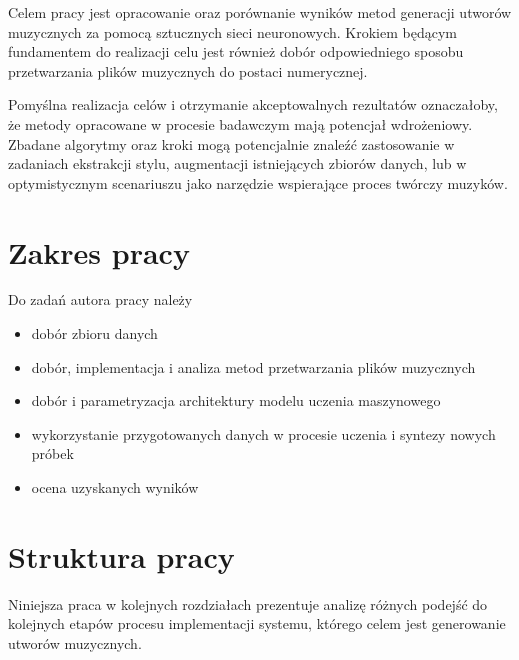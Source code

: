 {{        Celem pracy jest opracowanie oraz porównanie wyników metod generacji utworów muzycznych za pomocą
        sztucznych sieci neuronowych. Krokiem będącym fundamentem do realizacji celu jest również
        dobór odpowiedniego sposobu przetwarzania plików muzycznych do postaci numerycznej.
        
        
        Pomyślna realizacja celów i\,\,otrzymanie akceptowalnych rezultatów oznaczałoby, że
        metody opracowane w\,\,procesie badawczym mają potencjał wdrożeniowy. 
        Zbadane algorytmy oraz kroki mogą potencjalnie znaleźć zastosowanie
        w\,\,zadaniach ekstrakcji stylu, augmentacji istniejących zbiorów danych,
        lub w\,\,optymistycznym scenariuszu jako narzędzie wspierające proces twórczy muzyków.
    }

    \section{Zakres pracy}
    {
        Do zadań autora pracy należy
        \begin{itemize}
            \setlength\itemsep{-0.5em}
            \item dobór zbioru danych
            \item dobór, implementacja i\,\,analiza metod przetwarzania plików muzycznych
            \item dobór i\,\,parametryzacja architektury modelu uczenia maszynowego
            \item wykorzystanie przygotowanych danych 
            w\,\,procesie uczenia i\,\,syntezy nowych próbek
            \item ocena uzyskanych wyników
        \end{itemize}
    }

    \section{Struktura pracy}
    {
        Niniejsza praca w\,\,kolejnych rozdziałach prezentuje analizę różnych podejść do kolejnych etapów
        procesu implementacji systemu, którego celem jest generowanie utworów muzycznych. 

}}

